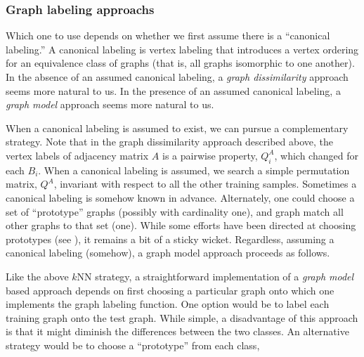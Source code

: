 \documentclass[10pt,journal,cspaper,compsoc]{IEEEtran}
\begin{document}
\subsubsection{Graph labeling approachs} %
\label{ssub:graph_labeling_approachs}


Which one to use depends on whether we first assume there is a ``canonical labeling.''  A canonical labeling is vertex labeling that introduces a vertex ordering for an equivalence class of graphs (that is, all graphs isomorphic to one another).  In the absence of an assumed canonical labeling, a \emph{graph dissimilarity} approach seems more natural to us.  In the presence of an assumed canonical labeling, a \emph{graph model} approach seems more natural to us.


When a canonical labeling is assumed to exist, we can pursue a complementary strategy. Note that in the graph dissimilarity approach described above, the vertex labels of adjacency matrix $A$ is a pairwise property, $Q^A_i$, which changed for each $B_i$.  When a canonical labeling is assumed, we search a simple permutation matrix, $Q^A$, invariant with respect to all the other training samples.  Sometimes a canonical labeling is somehow known in advance. Alternately, one could choose a set of ``prototype'' graphs (possibly with cardinality one), and graph match all other graphs to that set (one).  While some efforts have been directed at choosing prototypes (see  \cite{Bunke2011}), it remains a bit of a sticky wicket.  Regardless, assuming a canonical labeling (somehow), a graph model approach proceeds as follows.   

Like the above $k$NN strategy, a straightforward implementation of a \emph{graph model} based approach depends on first choosing a particular graph onto which one implements the graph labeling function.  One option would be to label each training graph onto the test graph.  While simple, a disadvantage of this approach is that it might diminish the differences between the two classes.  An alternative strategy would be to choose a ``prototype'' from each class, 

\end{document}
